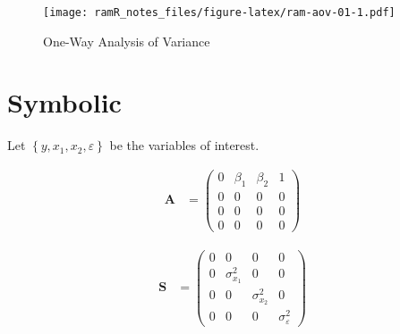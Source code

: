 \documentclass[
]{book}
\theoremstyle{definition}
\theoremstyle{definition}
\theoremstyle{definition}
\theoremstyle{remark}
\begin{document}
\begin{figure}
\centering
\texttt{[image: ramR\_notes\_files/figure-latex/ram-aov-01-1.pdf]}
\caption{\label{fig:ram-aov-01}One-Way Analysis of Variance}
\end{figure}

\hypertarget{symbolic-1}{%
\section{Symbolic}\label{symbolic-1}}

Let \(\left\{ y, x_1, x_2, \varepsilon \right\}\) be the variables of interest.

\begin{align*}\mathbf{A} &=\left( \begin{array}{cccc} 0 & \beta  _{1} & \beta  _{2} & 1 \\ 0 & 0 & 0 & 0 \\ 0 & 0 & 0 & 0 \\ 0 & 0 & 0 & 0 \end{array} \right)\end{align*}

\begin{align*}\mathbf{S} &=\left( \begin{array}{cccc} 0 & 0 & 0 & 0 \\ 0 & \sigma  _{x_{1}} ^{2} & 0 & 0 \\ 0 & 0 & \sigma  _{x_{2}} ^{2} & 0 \\ 0 & 0 & 0 & \sigma  _{\varepsilon } ^{2} \end{array} \right)\end{align*}
\end{document}
